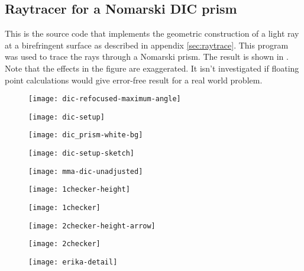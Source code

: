 \subsection{Raytracer for a Nomarski DIC prism}
\label{sec:source-raytrace}
This is the source code that implements the geometric construction of
a light ray at a birefringent surface as described in appendix
\ref{sec:raytrace}. This program was used to trace the rays through a
Nomarski prism. The result is shown in . Note
that the effects in the figure are exaggerated. It isn't investigated
if floating point calculations would give error-free result for a real
world problem.


\begin{figure}[htbp]
  \centering
  \texttt{[image: dic-refocused-maximum-angle]}
  \caption{}
  \label{fig:dic-refocused-maximum}
\end{figure}


\begin{figure}[htbp]
  \centering
  \texttt{[image: dic-setup]}
  \caption{}
  \label{fig:dic-setup}
\end{figure}


\begin{figure}[htbp]
  \centering
  \texttt{[image: dic\_prism-white-bg]}
  \caption{}
  \label{fig:dic_prism-white}
\end{figure}



\begin{figure}[htbp]
  \centering
  \texttt{[image: dic-setup-sketch]}
  \caption{}
  \label{fig:dic-setup-sketch}
\end{figure}

\begin{figure}[htbp]
  \centering
  \texttt{[image: mma-dic-unadjusted]}
  \caption{}
  \label{fig:mma-dic-unadjusted}
\end{figure}
\begin{figure}[htbp]
  \centering
  \texttt{[image: 1checker-height]}
  \caption{}
  \label{fig:1checker-height}
\end{figure}
\begin{figure}[htbp]
  \centering
  \texttt{[image: 1checker]}
  \caption{}
  \label{fig:1checker}
\end{figure}
\begin{figure}[htbp]
  \centering
  \texttt{[image: 2checker-height-arrow]}
  \caption{}
  \label{fig:height-arrow}
\end{figure}
\begin{figure}[htbp]
  \centering
  \texttt{[image: 2checker]}
  \caption{}
  \label{fig:2checker}
\end{figure}
\begin{figure}[htbp]
  \centering
  \texttt{[image: erika-detail]}
  \caption{}
  \label{fig:detail}
\end{figure}

